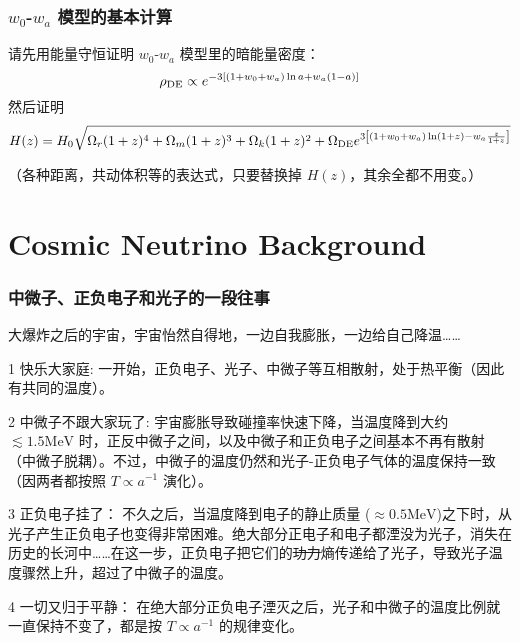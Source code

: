 \documentclass[CJK,13pt]{beamer}
\begin{document}
  \begin{frame}
    \frametitle{$w_0$-$w_a$ 模型的基本计算}
    请先用能量守恒证明 $w_0$-$w_a$ 模型里的暗能量密度：
    $$\rho_{\rm DE} \propto e^{-3\left[(1+w_0+w_a)\ln a + w_a(1-a)\right]}$$
    然后证明
   {\scriptsize $$H(z)=H_0\sqrt{\Omega_r(1+z)^4+\Omega_m(1+z)^3 + \Omega_k(1+z)^2+\Omega_{\rm DE}e^{3\left[(1+w_0+w_a)\ln (1+z) - w_a\frac{z}{1+z}\right]}}$$}

    \skiplines
    
    （各种距离，共动体积等的表达式，只要替换掉 $H(z)$，其余全都不用变。）
  \end{frame}

  \section{Cosmic Neutrino Background}


  \begin{frame}
    \frametitle{中微子、正负电子和光子的一段往事}
    大爆炸之后的宇宙，宇宙怡然自得地，一边自我膨胀，一边给自己降温……
    \bitem
  \item[1]{{\blue 快乐大家庭:} \scriptsize 一开始，正负电子、光子、中微子等互相散射，处于热平衡（因此有共同的温度）。}
  \item[2]{{\blue 中微子不跟大家玩了:} \scriptsize 宇宙膨胀导致碰撞率快速下降，当温度降到大约 $\lesssim 1.5\mathrm{MeV}$ 时，正反中微子之间，以及中微子和正负电子之间基本不再有散射（中微子脱耦）。不过，中微子的温度仍然和光子-正负电子气体的温度保持一致（因两者都按照 $T\propto a^{-1}$ 演化）。}
  \item[3]{{\blue 正负电子挂了：} \scriptsize 不久之后，当温度降到电子的静止质量 ($\approx 0.5\mathrm{MeV}$)之下时，从光子产生正负电子也变得非常困难。绝大部分正电子和电子都湮没为光子，消失在历史的长河中……在这一步，正负电子把它们的\sout{功力}熵传递给了光子，导致光子温度骤然上升，超过了中微子的温度。}
  \item[4]{{\blue 一切又归于平静：} \scriptsize 在绝大部分正负电子湮灭之后，光子和中微子的温度比例就一直保持不变了，都是按 $T\propto a^{-1}$ 的规律变化。}    
    \eitem
  \end{frame}
\end{document}
